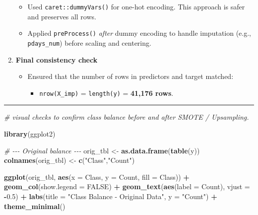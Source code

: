 \documentclass[
]{article}
\newenvironment{Shaded}{\begin{snugshade}}{\end{snugshade}}
\newcommand{\AttributeTok}[1]{\textcolor[rgb]{0.13,0.29,0.53}{#1}}
\newcommand{\CommentTok}[1]{\textcolor[rgb]{0.56,0.35,0.01}{\textit{#1}}}
\newcommand{\ConstantTok}[1]{\textcolor[rgb]{0.56,0.35,0.01}{#1}}
\newcommand{\FloatTok}[1]{\textcolor[rgb]{0.00,0.00,0.81}{#1}}
\newcommand{\FunctionTok}[1]{\textcolor[rgb]{0.13,0.29,0.53}{\textbf{#1}}}
\newcommand{\NormalTok}[1]{#1}
\newcommand{\OtherTok}[1]{\textcolor[rgb]{0.56,0.35,0.01}{#1}}
\newcommand{\SpecialCharTok}[1]{\textcolor[rgb]{0.81,0.36,0.00}{\textbf{#1}}}
\newcommand{\StringTok}[1]{\textcolor[rgb]{0.31,0.60,0.02}{#1}}
\providecommand{\tightlist}{%
  \setlength{\itemsep}{0pt}\setlength{\parskip}{0pt}}
\begin{document}
\begin{enumerate}
  \begin{itemize}
  \tightlist
  \item
    Used \texttt{caret::dummyVars()} for one-hot encoding. This approach
    is safer and preserves all rows.\\
  \item
    Applied \texttt{preProcess()} \emph{after} dummy encoding to handle
    imputation (e.g., \texttt{pdays\_num}) before scaling and centering.
  \end{itemize}
\item
  \textbf{Final consistency check}

  \begin{itemize}
  \tightlist
  \item
    Ensured that the number of rows in predictors and target matched:

    \begin{itemize}
    \tightlist
    \item
      \texttt{nrow(X\_imp)} = \texttt{length(y)} = \textbf{41,176 rows}.
    \end{itemize}
  \end{itemize}
\end{enumerate}

\begin{center}\rule{0.5\linewidth}{0.5pt}\end{center}

\begin{Shaded}
\begin{Highlighting}[]
\CommentTok{\# visual checks to confirm class balance before and after SMOTE / Upsampling.}

\FunctionTok{library}\NormalTok{(ggplot2)}

\CommentTok{\# {-}{-}{-} Original balance {-}{-}{-}}
\NormalTok{orig\_tbl }\OtherTok{\textless{}{-}} \FunctionTok{as.data.frame}\NormalTok{(}\FunctionTok{table}\NormalTok{(y))}
\FunctionTok{colnames}\NormalTok{(orig\_tbl) }\OtherTok{\textless{}{-}} \FunctionTok{c}\NormalTok{(}\StringTok{"Class"}\NormalTok{,}\StringTok{"Count"}\NormalTok{)}

\FunctionTok{ggplot}\NormalTok{(orig\_tbl, }\FunctionTok{aes}\NormalTok{(}\AttributeTok{x =}\NormalTok{ Class, }\AttributeTok{y =}\NormalTok{ Count, }\AttributeTok{fill =}\NormalTok{ Class)) }\SpecialCharTok{+}
  \FunctionTok{geom\_col}\NormalTok{(}\AttributeTok{show.legend =} \ConstantTok{FALSE}\NormalTok{) }\SpecialCharTok{+}
  \FunctionTok{geom\_text}\NormalTok{(}\FunctionTok{aes}\NormalTok{(}\AttributeTok{label =}\NormalTok{ Count), }\AttributeTok{vjust =} \SpecialCharTok{{-}}\FloatTok{0.5}\NormalTok{) }\SpecialCharTok{+}
  \FunctionTok{labs}\NormalTok{(}\AttributeTok{title =} \StringTok{"Class Balance {-} Original Data"}\NormalTok{, }\AttributeTok{y =} \StringTok{"Count"}\NormalTok{) }\SpecialCharTok{+}
  \FunctionTok{theme\_minimal}\NormalTok{()}
\end{Highlighting}
\end{Shaded}
\end{document}
